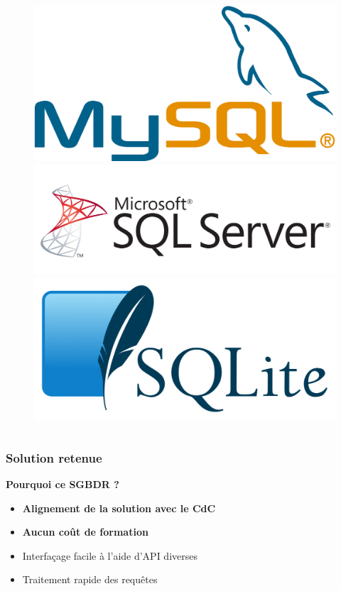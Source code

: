 \begin{frame}
\begin{columns}
\begin{column}{7cm}
\begin{figure}
\includegraphics[scale=0.04]{Images/MySQL}\\
\includegraphics[scale=0.052]{Images/MsSqlServer}
\includegraphics[scale=0.052]{Images/SQLite}
\end{figure}
\end{column}
\end{columns}
\end{frame}

\begin{frame}
\frametitle{Solution retenue}
\begin{block}{\textbf{Pourquoi ce SGBDR ?}}
\begin{itemize}
 \item \textbf{Alignement de la solution avec le CdC}
 \item \textbf{Aucun coût de formation}
 \item Interfaçage facile à l'aide d'API diverses
 \item Traitement rapide des requêtes
\end{itemize}
\end{block}
\end{frame}

